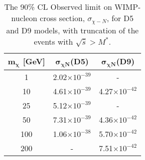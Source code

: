 \begin{table}[ht!]
   \centering
\begin{tabular}{ccc}
\hline\hline
$\mathbf{m_{\chi}}$ \textbf{[GeV]}               & {\bf $\mathbf{\sigma_{\chi N}}$(D5)} & {\bf $\mathbf{\sigma_{\chi N}}$(D9)} \\ 
\hline
1	   &	2.02$\times 10^{-39}$	&		-        	            \\
10	   &	4.61$\times 10^{-39}$	&		4.27$\times 10^{-42}$	\\
25	   &	5.12$\times 10^{-39}$	&		-        	            \\
50	   &	7.31$\times 10^{-39}$	&		4.36$\times 10^{-42}$	\\
100	   &	1.06$\times 10^{-38}$	&		5.70$\times 10^{-42}$	\\
200	   &	-                    	&		7.51$\times 10^{-42}$	\\
\hline\hline
\end{tabular}
\caption[The 90\% CL Observed limit on WIMP-nucleon cross section for D5 and D9 models, with truncation of the events with $\sqrt{\hat{s}}>M^*$.]{The 90\% CL Observed limit on WIMP-nucleon cross section, $\sigma_{\chi-N}$, for D5 and D9 models, with truncation of the events with $\sqrt{\hat{s}}>M^*$.}
\label{tab:WIMPsEffective_limit_sigma_truncated}
\end{table}
